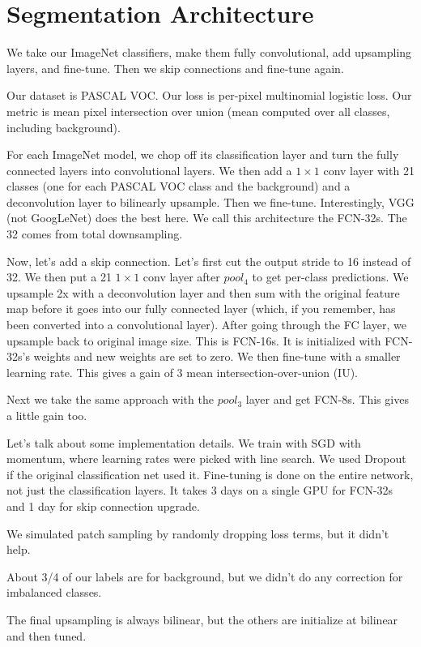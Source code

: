 \documentclass[a4paper]{article}
\begin{document}
\section{Segmentation Architecture}
We take our ImageNet classifiers, make them fully convolutional, add upsampling
layers, and fine-tune. Then we skip connections and fine-tune again.

Our dataset is PASCAL VOC. Our loss is per-pixel multinomial logistic loss.
Our metric is mean pixel intersection over union (mean computed over all
classes, including background).

For each ImageNet model, we chop off its classification layer and turn the
fully connected layers into convolutional layers. We then add a $1 \times 1$
conv layer with 21 classes (one for each PASCAL VOC class and the background)
and a deconvolution layer to bilinearly upsample. Then we fine-tune.
Interestingly, VGG (not GoogLeNet) does the best here. We call this architecture
the FCN-32s. The 32 comes from total downsampling.

Now, let's add a skip connection. Let's first cut the output stride to 16
instead of 32. We then put a 21 $1 \times 1$ conv layer after $pool_4$ to get
per-class predictions. We upsample 2x with a deconvolution layer and then
sum with the original feature map before it goes into our fully connected
layer (which, if you remember, has been converted into a convolutional layer).
After going through the FC layer, we upsample back to original image size. This
is FCN-16s. It is initialized with FCN-32s's weights and new weights are set to
zero. We then fine-tune with a smaller learning rate. This gives a gain of
3 mean intersection-over-union (IU).

Next we take the same approach with the $pool_3$ layer and get FCN-8s. This
gives a little gain too.

Let's talk about some implementation details. We train with SGD with momentum,
where learning rates were picked with line search. We used Dropout if the
original classification net used it. Fine-tuning is done on the entire network,
not just the classification layers. It takes 3 days on a single GPU for
FCN-32s and 1 day for skip connection upgrade.

We simulated patch sampling by randomly dropping loss terms, but it didn't help.

About 3/4 of our labels are for background, but we didn't do any correction for
imbalanced classes.

The final upsampling is always bilinear, but the others are initialize at
bilinear and then tuned.
\end{document}
